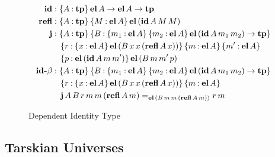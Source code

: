 \documentclass[11pt,twoside]{article}
\newcommand{\braces}[1]{\{#1\}}
\newcommand{\parens}[1]{(#1)}
\newcommand{\const}[1]{\textbf{#1}}
\newcommand{\eqclass}[3]{{#2}=_{#1}{#3}}
\newcommand{\piclass}[3]{\braces{{#2}\mathbin{:}{#1}}\,{#3}}
\newcommand{\arrclass}[2]{{#1}\to{#2}}
\newcommand{\appobj}[2]{{#1}\,{#2}}
\begin{document}
\begin{figure}
  
  \begin{align*}
    \idtp & : \piclass{\tpsort}{A}{\arrclass{\elof{A}}{\arrclass{\elof{A}}{\tpsort}}} \\
    \reflcon & : \piclass{\tpsort}{A}{\piclass{\elof{A}}{M}{\elofp{\idof{A}{M}{M}}}} \\
    \jcon & :
            \piclass{\tpsort}{A}{
            \piclass{\piclass{\elof{A}}{m_{1}}{\piclass{\elof{A}}{m_{2}}{\arrclass{\elofp{\idof{A}{m_{1}}{m_{2}}}}{\tpsort}}}}{B}{
            }} \\
           & \quad
             \piclass{\piclass{\elof{A}}{x}{\elofp{\appobj{\appobj{\appobj{B}{x}}{x}}{\parens{\reflof{A}{x}}}}}}{r}{
             \piclass{\elof{A}}{m}{\piclass{\elof{A}}{m'}{
             }}} \\
             & \quad
               \piclass{\elofp{\idof{A}{m}{m'}}}{p}{\elofp{\appobj{\appobj{\appobj{B}{m}}{m'}}{p}}} \\
    \idbetacon & :
            \piclass{\tpsort}{A}{
            \piclass{\piclass{\elof{A}}{m_{1}}{\piclass{\elof{A}}{m_{2}}{\arrclass{\elofp{\idof{A}{m_{1}}{m_{2}}}}{\tpsort}}}}{B}{
            }} \\
           & \quad
             \piclass{\piclass{\elof{A}}{x}{\elofp{\appobj{\appobj{\appobj{B}{x}}{x}}{\parens{\reflof{A}{x}}}}}}{r}{
             \piclass{\elof{A}}{m}{
             }} \\
           & \quad
             \eqclass
             {\elofp{\appobj{\appobj{\appobj{B}{m}}{m}}{\parens{\reflof{A}{m}}}}}
             {\jof{A}{B}{r}{m}{m}{\parens{\reflof{A}{m}}}}
             {\appobj{r}{m}}
  \end{align*}

  \caption{Dependent Identity Type}
  \label{fig:dep-id}
\end{figure}

\subsection{Tarskian Universes}

\newcommand{\unitp}{\const{u}}
\newcommand{\unisub}[1]{\appobj{\unitp}{#1}}
\newcommand{\exttp}{\const{ext}}
\newcommand{\extsub}[2]{\appobj{\appobj{\exttp}{#1}}{#2}}
\newcommand{\cumcon}{\const{$\uparrow$}}
\newcommand{\cumsub}[2]{\appobj{\appobj{\cumcon}{#1}}{#2}}
\newcommand{\natcon}{\overline{\const{nat}}}
\newcommand{\picon}{\overline{\const{pi}}}
\newcommand{\piconof}[2]{\appobj{\appobj{\picon}{#1}}{#2}}
\newcommand{\eqcon}{\overline{\const{eq}}}
\newcommand{\eqconof}[3]{\appobj{\appobj{\appobj{\eqcon}{#1}}{#2}}{#3}}
\newcommand{\unicon}{\overline{\const{u}}}
\newcommand{\uniconsub}[1]{\appobj{\unicon}{#1}}
\newcommand{\extnat}{\const{ext-nat}}
\newcommand{\extcum}{\const{ext-cum}}
\newcommand{\extuni}{\const{ext-uni}}
\newcommand{\extpi}{\const{ext-pi}}
\newcommand{\exteq}{\const{ext-eq}}
\end{document}
